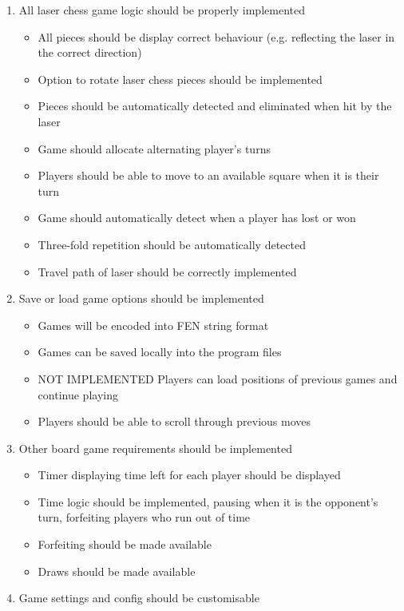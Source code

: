 \documentclass[../main/main.tex]{subfiles}
\begin{document}
\begin{enumerate}
\item All laser chess game logic should be properly implemented
    \begin{itemize}
    \item All pieces should be display correct behaviour (e.g. reflecting the laser in the correct direction)
    \item Option to rotate laser chess pieces should be implemented
    \item Pieces should be automatically detected and eliminated when hit by the laser
    \item Game should allocate alternating player’s turns
    \item Players should be able to move to an available square when it is their turn
    \item Game should automatically detect when a player has lost or won
    \item Three-fold repetition should be automatically detected
    \item Travel path of laser should be correctly implemented
    \end{itemize}
\item Save or load game options should be implemented \label{itm:save-games}
    \begin{itemize}
    \item Games will be encoded into FEN string format
    \item Games can be saved locally into the program files
    \item NOT IMPLEMENTED Players can load positions of previous games and continue playing
    \item Players should be able to scroll through previous moves
    \end{itemize}
\item Other board game requirements should be implemented
    \begin{itemize}
    \item Timer displaying time left for each player should be displayed
    \item Time logic should be implemented, pausing when it is the opponent’s turn, forfeiting players who run out of time
    \item Forfeiting should be made available
    \item Draws should be made available
    \end{itemize}
\item Game settings and config should be customisable

\end{enumerate}
\end{document}
